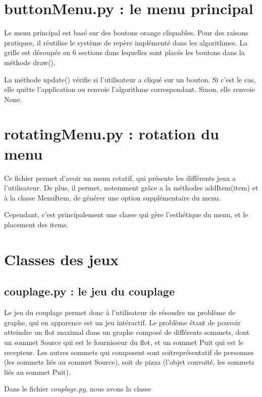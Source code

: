 \documentclass{scrreprt}
\begin{document}
\section{buttonMenu.py : le menu principal}

Le menu principal est basé sur des boutons orange cliquables. Pour des raisons pratiques,
 il réutilise le système de repère implémenté dans les algorithmes. La grille est découpée
 en 6 sections dans lequelles sont placés les boutons dans la méthode draw().

La méthode update() vérifie si l'utilisateur a cliqué sur un bouton. Si c'est le cas, elle
 quitte l'application ou renvoie l'algorithme correspondant. Sinon, elle renvoie None.

\section{rotatingMenu.py : rotation du menu}

Ce fichier permet d'avoir un menu rotatif, qui présente les différents jeux a l'utilisateur.
De plus, il permet, notemment grâce a la méthodes addItem(item) et à la classe MenuItem, de générer
 une option supplémentaire du menu.

Cependant, c'est principalement une classe qui gère l'esthétique du menu, et le placement des items.

\section{Classes des jeux}
	\subsection{couplage.py : le jeu du couplage}
	Le jeu du couplage permet donc à l'utilisateur de résoudre un problème de graphe, qui en apparence est
	 un jeu intéractif. Le problème étant de pouvoir atteindre un flot maximal dans un graphe composé de différents
	 sommets, dont un sommet Source qui est le fournisseur du flot, et un sommet Puit qui est le recepteur. Les autres sommets
	 qui composent sont soitreprésentatif de personnes (les sommets liés au sommet Source), soit de pizza (l'objet convoité, les 
	 sommets liés au sommet Puit).

	Dans le fichier \emph{couplage.py}, nous avons la classe 
\end{document}
